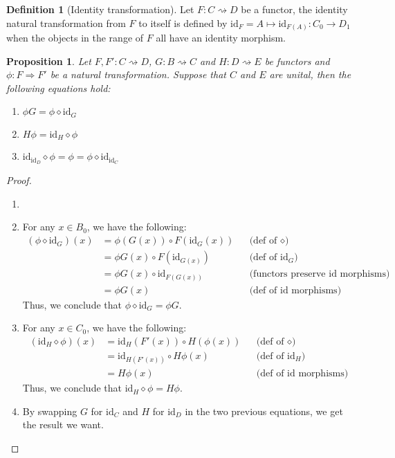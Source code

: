 \documentclass{scrartcl}
\newtheorem{prop}[thm]{Proposition}
\theoremstyle{definition}
\newtheorem{defn}[thm]{Definition}
\theoremstyle{remark}
\newcommand{\id}{\text{id}}
\begin{document}
\begin{defn}[Identity transformation]
    Let $F:C\rightsquigarrow D$ be a functor, the identity natural transformation from $F$ to itself is defined by $\id_F= A \mapsto \id_{F(A)}: C_0 \rightarrow D_1$ when the objects in the range of $F$ all have an identity morphism.
\end{defn}
\begin{prop}
    Let $F,F':C\rightsquigarrow D$, $G:B\rightsquigarrow C$ and $H:D\rightsquigarrow E$ be functors and $\phi:F\Rightarrow F'$ be a natural transformation. Suppose that $C$ and $E$ are unital, then the following equations hold:
    \begin{enumerate}
        \item $\phi G = \phi \diamond \id_G$
        \item $H\phi = \id_H \diamond \phi$
        \item $\id_{\id_D} \diamond \phi = \phi = \phi \diamond \id_{\id_C}$
    \end{enumerate}
\end{prop}
\begin{proof}
\begin{enumerate}
    \item[]
    \item For any $x \in B_0$, we have the following:\begin{align*}
        (\phi \diamond \id_G)(x) &= \phi(G(x)) \circ F(\id_G(x)) &&\mbox{(def of $\diamond$)}\\
        &= \phi G(x) \circ F(\id_{G(x)})  &&\mbox{(def of $\id_G$)}\\
        &= \phi G(x) \circ \id_{F(G(x))} &&\mbox{(functors preserve $\id$ morphisms)}\\
        &= \phi G(x) &&\mbox{(def of $\id$ morphisms)}
    \end{align*}
    Thus, we conclude that $\phi \diamond \id_G = \phi G$.
    \item For any $x \in C_0$, we have the following:\begin{align*}
        (\id_H \diamond \phi)(x) &= \id_H(F'(x)) \circ H(\phi(x)) &&\mbox{(def of $\diamond$)}\\
        &= \id_{H(F'(x))} \circ H\phi(x)  &&\mbox{(def of $\id_H$)}\\
        &= H\phi(x) &&\mbox{(def of $\id$ morphisms)}
    \end{align*}
    Thus, we conclude that $\id_H \diamond \phi = H\phi$.
    \item By swapping $G$ for $\id_C$ and $H$ for $\id_D$ in the two previous equations, we get the result we want.
\end{enumerate}
\end{proof}
\end{document}
